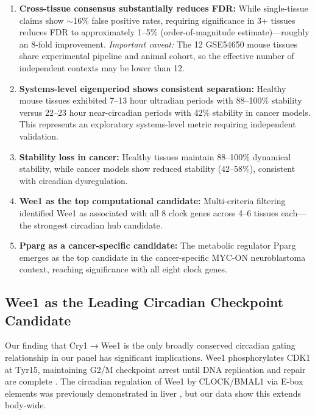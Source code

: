 \documentclass[11pt,a4paper]{article}
\begin{document}
\begin{enumerate}
    \item \textbf{Cross-tissue consensus substantially reduces FDR:} While single-tissue claims show $\sim$16\% false positive rates, requiring significance in 3+ tissues reduces FDR to approximately 1--5\% (order-of-magnitude estimate)---roughly an 8-fold improvement. \textit{Important caveat:} The 12 GSE54650 mouse tissues share experimental pipeline and animal cohort, so the effective number of independent contexts may be lower than 12.
    
    \item \textbf{Systems-level eigenperiod shows consistent separation:} Healthy mouse tissues exhibited 7--13 hour ultradian periods with 88--100\% stability versus 22--23 hour near-circadian periods with 42\% stability in cancer models. This represents an exploratory systems-level metric requiring independent validation.
    
    \item \textbf{Stability loss in cancer:} Healthy tissues maintain 88--100\% dynamical stability, while cancer models show reduced stability (42--58\%), consistent with circadian dysregulation.
    
    \item \textbf{Wee1 as the top computational candidate:} Multi-criteria filtering identified Wee1 as associated with all 8 clock genes across 4--6 tissues each---the strongest circadian hub candidate.
    
    \item \textbf{Pparg as a cancer-specific candidate:} The metabolic regulator Pparg emerges as the top candidate in the cancer-specific MYC-ON neuroblastoma context, reaching significance with all eight clock genes.
\end{enumerate}

\subsection{Wee1 as the Leading Circadian Checkpoint Candidate}

Our finding that Cry1$\rightarrow$Wee1 is the only broadly conserved circadian gating relationship in our panel has significant implications. Wee1 phosphorylates CDK1 at Tyr15, maintaining G2/M checkpoint arrest until DNA replication and repair are complete \citep{mcgowan1995}. The circadian regulation of Wee1 by CLOCK/BMAL1 via E-box elements was previously demonstrated in liver \citep{matsuo2003}, but our data show this extends body-wide.
\end{document}
